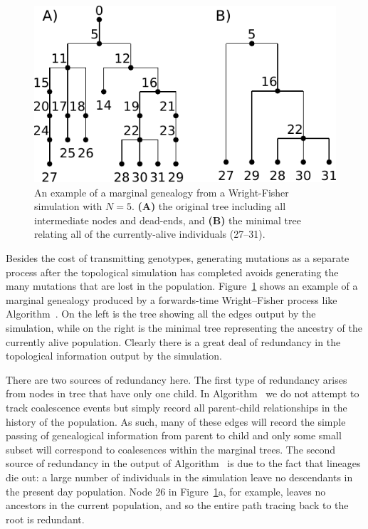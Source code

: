 \documentclass{article}
\begin{document}
\begin{figure}
    \begin{center}
        \includegraphics{wf-before-after}
    \end{center}
    \caption{An example of a marginal genealogy from a Wright-Fisher simulation
    with $N=5$. \textbf{(A)} the original tree including all
    intermediate nodes and dead-ends, and \textbf{(B)} the minimal tree
    relating all of the currently-alive individuals (27--31).
    \label{fig:wf-trees}
    }
\end{figure}

Besides the cost of transmitting genotypes,
generating mutations as a separate process after the topological simulation has completed
avoids generating the many mutations that are lost in the population.
Figure~\ref{fig:wf-trees} shows
an example of a marginal genealogy produced by a forwards-time Wright--Fisher
process like Algorithm~.
On the left is the tree showing all the edges output by the simulation,
while on the right
is the minimal tree representing the ancestry of the currently alive
population. Clearly there is a great deal of redundancy in the topological
information output by the simulation.

There are two sources of redundancy here. The first type of redundancy arises
from nodes in tree that have only one child. In Algorithm~ we do
not attempt to track coalescence events but simply record all parent-child
relationships in the history of the population. As such, many of these edges
will record the simple passing of genealogical information from parent to child
and only some small subset will correspond to coalesences within the marginal
trees. The second source of redundancy in the output of Algorithm~
is due to the fact that lineages die out: a large number of
individuals in the simulation leave no descendants in the present day population.
Node 26 in Figure~\ref{fig:wf-trees}a, for example, leaves no
ancestors in the current population, and so the entire path tracing back to
the root is redundant.
\end{document}
